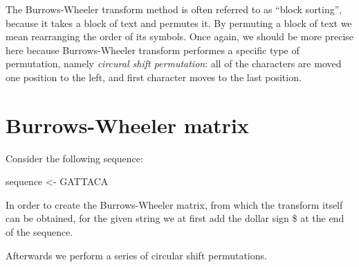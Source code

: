 \documentclass[
]{book}
\newenvironment{Shaded}{\begin{snugshade}}{\end{snugshade}}
\newcommand{\FunctionTok}[1]{\textcolor[rgb]{0.00,0.00,0.00}{#1}}
\newcommand{\NormalTok}[1]{#1}
\newcommand{\OtherTok}[1]{\textcolor[rgb]{0.56,0.35,0.01}{#1}}
\newcommand{\StringTok}[1]{\textcolor[rgb]{0.31,0.60,0.02}{#1}}
\begin{document}
The Burrows-Wheeler transform method is often referred to as ``block sorting'', because it takes a block of text and permutes it. By permuting a block of text we mean rearranging the order of its symbols. Once again, we should be more precise here because Burrows-Wheeler transform performes a specific type of permutation, namely \emph{circural shift permutation}: all of the characters are moved one position to the left, and first character moves to the last position.

\hypertarget{burrows-wheeler-matrix}{%
\section{Burrows-Wheeler matrix}\label{burrows-wheeler-matrix}}

Consider the following sequence:

\begin{Shaded}
\begin{Highlighting}[numbers=left,,]
\NormalTok{sequence }\OtherTok{\textless{}{-}} \StringTok{\textquotesingle{}GATTACA\textquotesingle{}}
\end{Highlighting}
\end{Shaded}

In order to create the Burrows-Wheeler matrix, from which the transform itself can be obtained, for the given string we at first add the dollar sign \$ at the end of the sequence.

\begin{Shaded}
\end{Shaded}

Afterwards we perform a series of circular shift permutations.
\end{document}

